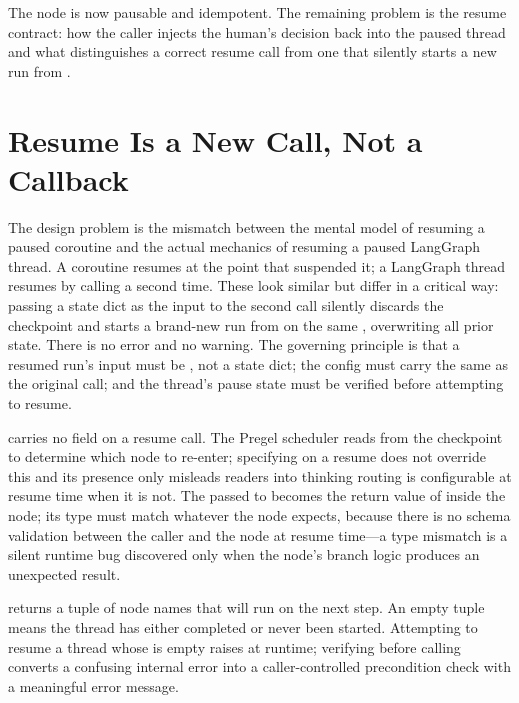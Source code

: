 The node is now pausable and idempotent. The remaining problem is the resume
contract: how the caller injects the human's decision back into the paused
thread and what distinguishes a correct resume call from one that silently
starts a new run from .


\section{Resume Is a New Call, Not a Callback}
\label{sec:hitl-resume}

The design problem is the mismatch between the mental model of resuming a
paused coroutine and the actual mechanics of resuming a paused LangGraph
thread. A coroutine resumes at the  point that suspended it;
a LangGraph thread resumes by calling  a second time.
These look similar but differ in a critical way: passing a state dict as the
input to the second  call silently discards the checkpoint
and starts a brand-new run from  on the same ,
overwriting all prior state. There is no error and no warning. The governing
principle is that a resumed run's input must be ,
not a state dict; the config must carry the same  as the
original call; and the thread's pause state must be verified before
attempting to resume.

 carries no  field on a resume call.
The Pregel scheduler reads  from the checkpoint to
determine which node to re-enter; specifying  on a resume
 does not override this and its presence only misleads readers
into thinking routing is configurable at resume time when it is not. The
 passed to  becomes the return value of
 inside the node; its type must match whatever the node
expects, because there is no schema validation between the caller and the
node at resume time---a type mismatch is a silent runtime bug discovered only
when the node's branch logic produces an unexpected result.

\begin{notebox}
 returns a tuple of node names that
will run on the next step. An empty tuple means the thread has either
completed or never been started. Attempting to resume a thread whose
 is empty raises  at runtime; verifying
 before calling  converts a
confusing internal error into a caller-controlled precondition check with a
meaningful error message.
\end{notebox}

